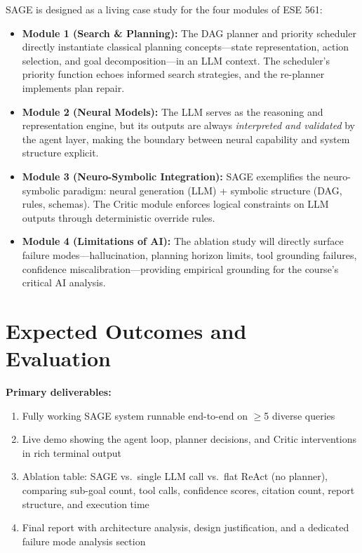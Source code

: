 \documentclass[11pt]{article}
\begin{document}
SAGE is designed as a living case study for the four modules of ESE 561:

\begin{itemize}[leftmargin=1.5em, itemsep=3pt]
  \item \textbf{Module 1 (Search \& Planning):} The DAG planner and priority scheduler
        directly instantiate classical planning concepts---state representation, action
        selection, and goal decomposition---in an LLM context. The scheduler's priority function echoes informed search strategies, and the re-planner implements plan repair.
  \item \textbf{Module 2 (Neural Models):} The LLM serves as the reasoning and
        representation engine, but its outputs are always \emph{interpreted and validated}
        by the agent layer, making the boundary between neural capability and system structure explicit.
  \item \textbf{Module 3 (Neuro-Symbolic Integration):} SAGE exemplifies the
        neuro-symbolic paradigm: neural generation (LLM) + symbolic structure (DAG,
        rules, schemas). The Critic module enforces logical constraints on LLM outputs through deterministic override rules.
  \item \textbf{Module 4 (Limitations of AI):} The ablation study will directly surface
        failure modes---hallucination, planning horizon limits, tool grounding failures,
        confidence miscalibration---providing empirical grounding for the course's critical AI analysis.
\end{itemize}

\section{Expected Outcomes and Evaluation}

\textbf{Primary deliverables:}
\begin{enumerate}[leftmargin=1.5em, itemsep=2pt]
  \item Fully working SAGE system runnable end-to-end on $\geq$5 diverse queries
  \item Live demo showing the agent loop, planner decisions, and Critic interventions in rich terminal output
  \item Ablation table: SAGE vs.\ single LLM call vs.\ flat ReAct (no planner), comparing sub-goal count, tool calls, confidence scores, citation count, report structure, and execution time
  \item Final report with architecture analysis, design justification, and a dedicated failure mode analysis section
\end{enumerate}
\end{document}
